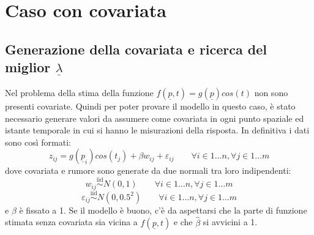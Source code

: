 \documentclass[a4paper,11pt,twoside,openright]{book}							%
\begin{document}
\section{Caso con covariata}

\subsection{Generazione della covariata e ricerca del miglior $\underline \lambda$}
Nel problema della stima della funzione $f(\underline p,t)=g(\underline p)cos(t)$ non sono presenti covariate. Quindi per poter provare il modello in questo caso, è stato necessario generare valori da assumere come covariata in ogni punto spaziale ed istante temporale in cui si hanno le misurazioni della risposta.
\newpage
In definitiva i dati sono così formati:
$$
z_{ij}=g(\underline p_{i})cos(t_j) + \beta w_{ij} + \varepsilon_{ij} \qquad \forall i \in 1\ldots n, \forall j \in 1\ldots m
$$
dove covariata e rumore sono generate da due normali tra loro indipendenti:
$$
w_{ij}\stackrel{\mathrm{iid}}{\sim}N(0,1) \qquad \forall i \in 1\ldots n, \forall j \in 1\ldots m
$$
$$
\varepsilon_{ij}\stackrel{\mathrm{iid}}{\sim}N(0,0.5^2) \qquad \forall i \in 1\ldots n, \forall j \in 1\ldots m
$$
e $\beta$ è fissato a 1. Se il modello è buono, c'è da aspettarsi che la parte di funzione stimata senza covariata sia vicina a $f(\underline p,t)$ e che $\hat{\beta}$ si avvicini a 1.
 
\end{document}
